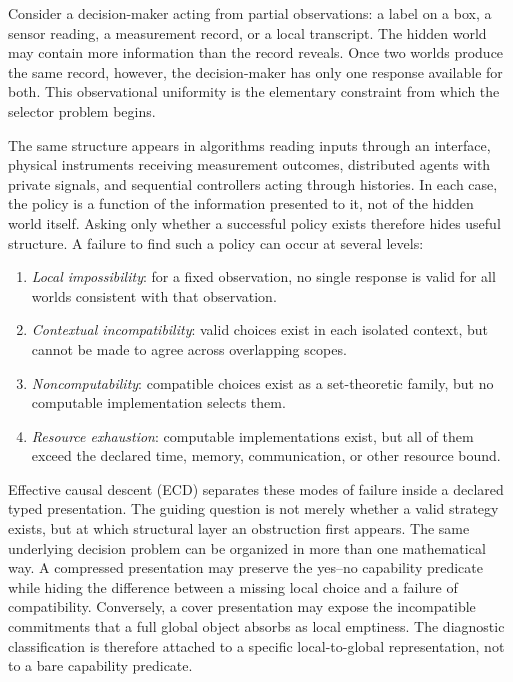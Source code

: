 \documentclass[11pt]{article}
\theoremstyle{plain}
\theoremstyle{definition}
\theoremstyle{remark}
\begin{document}
Consider a decision-maker acting from partial observations: a label on a box, a
sensor reading, a measurement record, or a local transcript. The hidden world may
contain more information than the record reveals. Once two worlds produce the
same record, however, the decision-maker has only one response available for
both. This observational uniformity is the elementary constraint from which the
selector problem begins.

The same structure appears in algorithms reading inputs through an interface,
physical instruments receiving measurement outcomes, distributed agents with
private signals, and sequential controllers acting through histories. In each
case, the policy is a function of the information presented to it, not of the
hidden world itself. Asking only whether a successful policy exists therefore
hides useful structure. A failure to find such a policy can occur at several
levels:
\begin{enumerate}[label=(\roman*)]
\item \emph{Local impossibility}: for a fixed observation, no single response is
valid for all worlds consistent with that observation.
\item \emph{Contextual incompatibility}: valid choices exist in each isolated
context, but cannot be made to agree across overlapping scopes.
\item \emph{Noncomputability}: compatible choices exist as a set-theoretic
family, but no computable implementation selects them.
\item \emph{Resource exhaustion}: computable implementations exist, but all of
them exceed the declared time, memory, communication, or other resource bound.
\end{enumerate}

Effective causal descent (ECD) separates these modes of failure inside a
declared typed presentation. The guiding question is not merely whether a valid
strategy exists, but at which structural layer an obstruction first appears. The
same underlying decision problem can be organized in more than one mathematical
way. A compressed presentation may preserve the yes--no capability predicate
while hiding the difference between a missing local choice and a failure of
compatibility. Conversely, a cover presentation may expose the incompatible
commitments that a full global object absorbs as local emptiness. The diagnostic
classification is therefore attached to a specific local-to-global
representation, not to a bare capability predicate.
\end{document}
